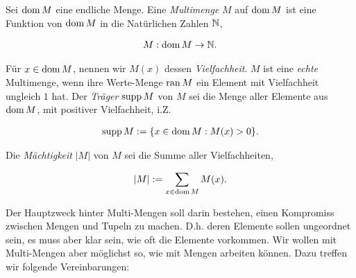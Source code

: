             \begin{definition}

                Sei $\operatorname{dom} M$ eine endliche Menge.
                Eine \textit{Multimenge} $M$ auf $\operatorname{dom} M$ ist eine Funktion von $\operatorname{dom} M$ in die Natürlichen Zahlen $\mathbb N$,

                \begin{align*}
                    M: \operatorname{dom} M \to \mathbb N.
                \end{align*}

                Für $x \in \operatorname{dom} M$, nennen wir $M(x)$ dessen \textit{Vielfachheit}.
                $M$ ist eine \textit{echte} Multimenge, wenn ihre Werte-Menge $\operatorname{ran} M$ ein Element mit Vielfachheit ungleich $1$ hat.
                Der \textit{Träger} $\operatorname{supp} M$ von $M$ sei die Menge aller Elemente aus $\operatorname{dom} M$, mit positiver Vielfachheit, i.Z.

                \begin{align*}
                    \operatorname{supp} M
                    :=
                    {\left \{ x \in \operatorname{dom} M: M(x) > 0 \right \}}.
                \end{align*}

                Die \textit{Mächtigkeit} $|M|$ von $M$ sei die Summe aller Vielfachheiten,

                \begin{align*}
                    |M| := \sum_{x \in \operatorname{dom} M} M(x).
                \end{align*}

            \end{definition}

            Der Hauptzweck hinter Multi-Mengen soll darin bestehen, einen Kompromiss zwischen Mengen und Tupeln zu machen.
            D.h. deren Elemente sollen ungeordnet sein, es muss aber klar sein, wie oft die Elemente vorkommen.
            Wir wollen mit Multi-Mengen aber möglichst so, wie mit Mengen arbeiten können.
            Dazu treffen wir folgende Vereinbarungen:

